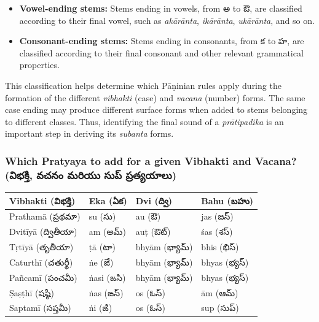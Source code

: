 \documentclass[12pt,a4paper]{article}
\newcommand{\te}[1]{{\telugufont #1}}
\renewcommand{\arraystretch}{1.25}
\begin{document}
\begin{itemize}
\begin{itemize}
    \item \textbf{Vowel-ending stems:} Stems ending in vowels, from \te{అ} to \te{ఔ}, are classified according to their final vowel, such as \textit{akārānta}, \textit{ikārānta}, \textit{ukārānta}, and so on.

    \item \textbf{Consonant-ending stems:} Stems ending in consonants, from \te{క} to \te{హ}, are classified according to their final consonant and other relevant grammatical properties.
\end{itemize}

This classification helps determine which Pāṇinian rules apply during the formation of the different \textit{vibhakti} (case) and \textit{vacana} (number) forms. The same case ending may produce different surface forms when added to stems belonging to different classes. Thus, identifying the final sound of a \textit{prātipadika} is an important step in deriving its \textit{subanta} forms.


\end{itemize}

\subsubsection{Which Pratyaya to add for a given Vibhakti and Vacana? (\te{విభక్తి, వచనం మరియు సుప్ ప్రత్యయాలు})}

\begin{center}
\small
\renewcommand{\arraystretch}{1.5}

\begin{tabularx}{\textwidth}{
  >{\raggedright\arraybackslash}p{2.5cm}
  >{\centering\arraybackslash}X
  >{\centering\arraybackslash}X
  >{\centering\arraybackslash}X
}
\toprule
\rowcolor{navy}
\color{white}\textbf{Vibhakti (\te{విభక్తి})} &
\color{white}\textbf{Eka (\te{ఏక})} &
\color{white}\textbf{Dvi (\te{ద్వి})} &
\color{white}\textbf{Bahu (\te{బహు})}\\
\midrule
Prathamā (\te{ప్రథమా}) & su (\te{సు}) & au (\te{ఔ}) & jas (\te{జస్})\\
Dvitīyā (\te{ద్వితీయా}) & am (\te{అమ్}) & auṭ (\te{ఔట్}) & śas (\te{శస్})\\
Tṛtīyā (\te{తృతీయా}) & ṭā (\te{టా}) & bhyām (\te{భ్యామ్}) & bhis (\te{భిస్})\\
Caturthī (\te{చతుర్థీ}) & ṅe (\te{ఙే}) & bhyām (\te{భ్యామ్}) & bhyas (\te{భ్యస్})\\
Pañcamī (\te{పంచమీ}) & ṅasi (\te{ఙసి}) & bhyām (\te{భ్యామ్}) & bhyas (\te{భ్యస్})\\
Ṣaṣṭhī (\te{షష్ఠీ}) & ṅas (\te{ఙస్}) & os (\te{ఓస్}) & ām (\te{ఆమ్})\\
Saptamī (\te{సప్తమీ}) & ṅi (\te{ఙి}) & os (\te{ఓస్}) & sup (\te{సుప్})\\
\bottomrule
\end{tabularx}
\end{center}
\normalsize
\end{document}

